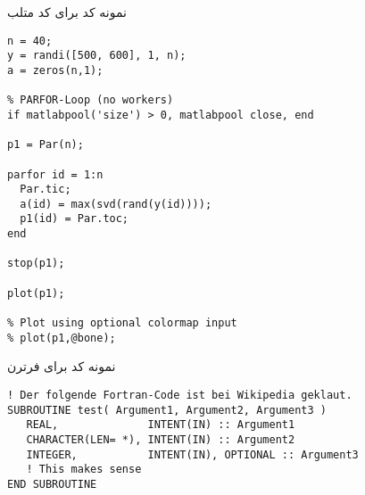 نمونه کد برای کد متلب
\begin{latin}
 \begin{lstlisting}[style=mymatlab]
  n = 40;
y = randi([500, 600], 1, n);
a = zeros(n,1);

% PARFOR-Loop (no workers)
if matlabpool('size') > 0, matlabpool close, end

p1 = Par(n);

parfor id = 1:n
  Par.tic;
  a(id) = max(svd(rand(y(id))));
  p1(id) = Par.toc;
end

stop(p1);

plot(p1);

% Plot using optional colormap input
% plot(p1,@bone);
 \end{lstlisting}
\end{latin}
نمونه کد برای فرترن
\begin{latin}
 \begin{lstlisting}[style=myfortran]
! Der folgende Fortran-Code ist bei Wikipedia geklaut.
SUBROUTINE test( Argument1, Argument2, Argument3 )
   REAL,              INTENT(IN) :: Argument1
   CHARACTER(LEN= *), INTENT(IN) :: Argument2
   INTEGER,           INTENT(IN), OPTIONAL :: Argument3
   ! This makes sense
END SUBROUTINE
\end{lstlisting}
\end{latin}


